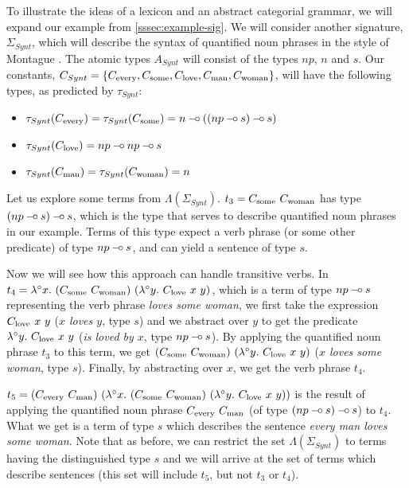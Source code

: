 \documentclass{article}
\def\limp {\mathbin{{-}\mkern-3.5mu{\circ}}}
\begin{document}
To illustrate the ideas of a lexicon and an abstract categorial grammar,
we will expand our example from \ref{sssec:example-sig}. We will
consider another signature, $\Sigma_{Synt}$, which will describe the
syntax of quantified noun phrases in the style of Montague
\cite{montague1973proper}. The atomic types $A_{Synt}$ will consist of
the types $np$, $n$ and $s$. Our constants, $C_{Synt} = \{C_{\textrm{every}},
C_{\textrm{some}}, C_{\textrm{love}}, C_{\textrm{man}}, C_{\textrm{woman}}\}$, will have the
following types, as predicted by $\tau_{Synt}$:
\begin{itemize}
\item $\tau_{Synt}(\synt{every}) = \tau_{Synt}(\synt{some}) = n \limp
  ((np \limp s) \limp s)$
\item $\tau_{Synt}(\synt{love}) = np \limp np \limp s$
\item $\tau_{Synt}(C_{\textrm{man}}) = \tau_{Synt}(C_{\textrm{woman}}) = n$
\end{itemize}

Let us explore some terms from $\Lambda(\Sigma_{Synt})$. $t_3 =
C_{\textrm{some}}\ C_{\textrm{woman}}$ has type $(np \limp s) \limp s$, which is the
type that serves to describe quantified noun phrases in our
example. Terms of this type expect a verb phrase (or some other
predicate) of type $np \limp s$, and can yield a sentence of type $s$.

Now we will see how this approach can handle transitive verbs. In $t_4 =
\lambda^{\circ} x.\ (C_{\textrm{some}}\ C_{\textrm{woman}})\ (\lambda^{\circ}
y.\ C_{\textrm{love}}\ x\ y)$, which is a term of type $np \limp s$
representing the verb phrase \emph{loves some woman}, we first take the
expression $C_{\textrm{love}}\ x\ y$ (\emph{$x$ loves $y$}, type $s$) and we
abstract over $y$ to get the predicate $\lambda^{\circ}
y.\ C_{\textrm{love}}\ x\ y$ (\emph{is loved by $x$}, type $np \limp s$). By
applying the quantified noun phrase $t_3$ to this term, we get
$(\synt{some}\ \synt{woman})\ (\lambda^{\circ} y.\ \synt{love}\ x\ y)$
(\emph{$x$ loves some woman}, type $s$). Finally, by abstracting over
$x$, we get the verb phrase $t_4$.

$t_5 = (\synt{every}\ \synt{man})\ (\lambda^{\circ}
x.\ (\synt{some}\ \synt{woman})\ (\lambda^{\circ}
y.\ \synt{love}\ x\ y))$ is the result of applying the quantified noun
phrase $C_{\textrm{every}}\ C_{\textrm{man}}$ (of type $(np \limp s) \limp s$) to
$t_4$. What we get is a term of type $s$ which describes the sentence
\emph{every man loves some woman}. Note that as before, we can restrict
the set $\Lambda(\Sigma_{Synt})$ to terms having the distinguished type
$s$ and we will arrive at the set of terms which describe sentences
(this set will include $t_5$, but not $t_3$ or $t_4$).
\end{document}
